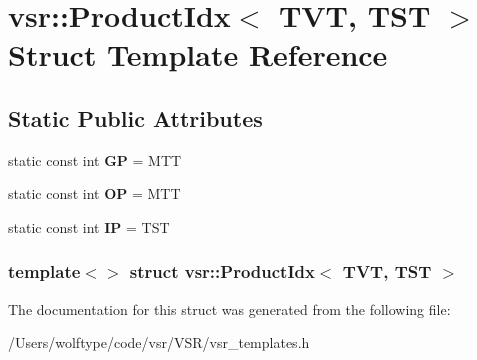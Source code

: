 \hypertarget{structvsr_1_1_product_idx_3_01_t_v_t_00_01_t_s_t_01_4}{\section{vsr\-:\-:Product\-Idx$<$ T\-V\-T, T\-S\-T $>$ Struct Template Reference}
\label{structvsr_1_1_product_idx_3_01_t_v_t_00_01_t_s_t_01_4}
}
\subsection*{Static Public Attributes}
\begin{DoxyCompactItemize}
\item 
\hypertarget{structvsr_1_1_product_idx_3_01_t_v_t_00_01_t_s_t_01_4_a6b6ba1bbaf541b48dc044b9f804f0184}{static const int {\bfseries G\-P} = M\-T\-T}\label{structvsr_1_1_product_idx_3_01_t_v_t_00_01_t_s_t_01_4_a6b6ba1bbaf541b48dc044b9f804f0184}

\item 
\hypertarget{structvsr_1_1_product_idx_3_01_t_v_t_00_01_t_s_t_01_4_a4e19149be1fbc704355d9a9544aada1c}{static const int {\bfseries O\-P} = M\-T\-T}\label{structvsr_1_1_product_idx_3_01_t_v_t_00_01_t_s_t_01_4_a4e19149be1fbc704355d9a9544aada1c}

\item 
\hypertarget{structvsr_1_1_product_idx_3_01_t_v_t_00_01_t_s_t_01_4_a6e18651292ed042dea715ce98af6d5c7}{static const int {\bfseries I\-P} = T\-S\-T}\label{structvsr_1_1_product_idx_3_01_t_v_t_00_01_t_s_t_01_4_a6e18651292ed042dea715ce98af6d5c7}

\end{DoxyCompactItemize}
\subsubsection*{template$<$$>$ struct vsr\-::\-Product\-Idx$<$ T\-V\-T, T\-S\-T $>$}



The documentation for this struct was generated from the following file\-:\begin{DoxyCompactItemize}
\item 
/\-Users/wolftype/code/vsr/\-V\-S\-R/vsr\-\_\-templates.\-h\end{DoxyCompactItemize}
